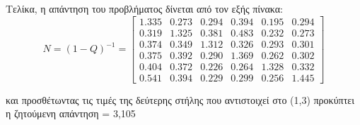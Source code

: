 \clearpage
Τελίκα, η απάντηση του προβλήματος δίνεται από τον εξής πίνακα:
\begin{equation}
    N = (1 - Q)^{-1} = \begin{bmatrix} 1.335 & 0.273 & 0.294 & 0.394 & 0.195 & 0.294  \\
                                       0.319 & 1.325 & 0.381 & 0.483 & 0.232 & 0.273  \\
                                       0.374 & 0.349 & 1.312 & 0.326 & 0.293 & 0.301  \\
                                       0.375 & 0.392 & 0.290 & 1.369 & 0.262 & 0.302  \\
                                       0.404 & 0.372 & 0.226 & 0.264 & 1.328 & 0.332  \\
                                       0.541 & 0.394 & 0.229 & 0.299 & 0.256 & 1.445 
\end{bmatrix} 
\end{equation}

και προσθέτωντας τις τιμές της δεύτερης στήλης που αντιστοιχεί στο (1,3) προκύπτει η ζητούμενη απάντηση = 3,105  
